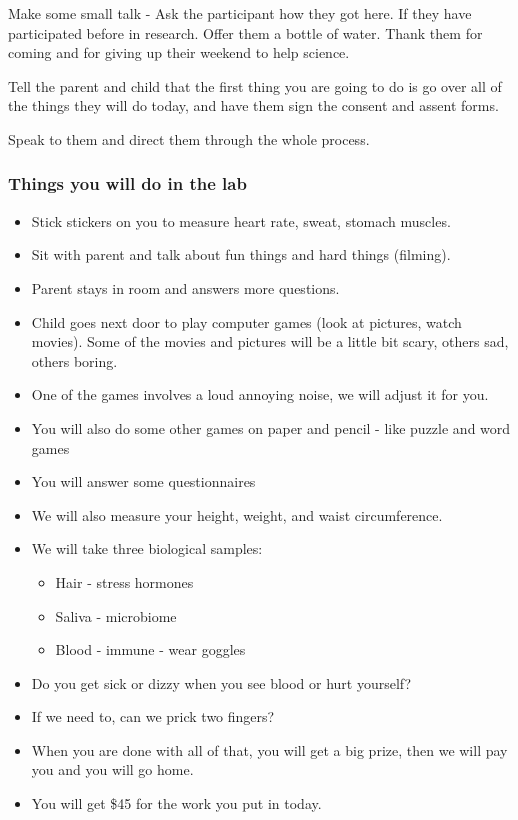 \documentclass[]{book}
\providecommand{\tightlist}{%
  \setlength{\itemsep}{0pt}\setlength{\parskip}{0pt}}
\begin{document}
Make some small talk - Ask the participant how they got here. If they have participated before in research. Offer them a bottle of water. Thank them for coming and for giving up their weekend to help science.

Tell the parent and child that the first thing you are going to do is go over all of the things they will do today, and have them sign the consent and assent forms.

Speak to them and direct them through the whole process.

\hypertarget{things-you-will-do-in-the-lab}{%
\subsubsection{Things you will do in the lab}\label{things-you-will-do-in-the-lab}}

\begin{itemize}
\tightlist
\item
  Stick stickers on you to measure heart rate, sweat, stomach muscles.
\item
  Sit with parent and talk about fun things and hard things (filming).
\item
  Parent stays in room and answers more questions.
\item
  Child goes next door to play computer games (look at pictures, watch movies). Some of the movies and pictures will be a little bit scary, others sad, others boring.
\item
  One of the games involves a loud annoying noise, we will adjust it for you.
\item
  You will also do some other games on paper and pencil - like puzzle and word games
\item
  You will answer some questionnaires
\item
  We will also measure your height, weight, and waist circumference.
\item
  We will take three biological samples:

  \begin{itemize}
  \tightlist
  \item
    Hair - stress hormones
  \item
    Saliva - microbiome
  \item
    Blood - immune - wear goggles
  \end{itemize}
\item
  Do you get sick or dizzy when you see blood or hurt yourself?
\item
  If we need to, can we prick two fingers?
\item
  When you are done with all of that, you will get a big prize, then we will pay you and you will go home.
\item
  You will get \$45 for the work you put in today.
\end{itemize}
\end{document}
